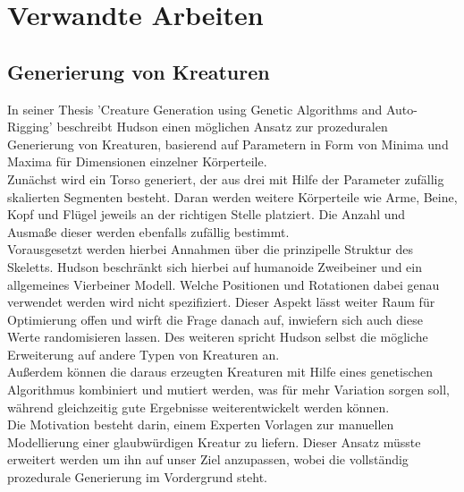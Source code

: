 \chapter{Verwandte Arbeiten}
\label{Verwandte_Arbeiten}


\section{Generierung von Kreaturen}
In seiner Thesis 'Creature Generation using Genetic Algorithms and Auto-Rigging' \cite{Hudson2013CreatureGU} beschreibt Hudson einen möglichen Ansatz zur prozeduralen Generierung von Kreaturen, basierend auf Parametern in Form von Minima und Maxima für Dimensionen einzelner Körperteile.\\ Zunächst wird ein Torso generiert, der aus drei mit Hilfe der Parameter zufällig skalierten Segmenten besteht. Daran werden weitere Körperteile wie Arme, Beine, Kopf und Flügel jeweils an der richtigen Stelle platziert. Die Anzahl und Ausmaße dieser werden ebenfalls zufällig bestimmt.\\
Vorausgesetzt werden hierbei Annahmen über die prinzipelle Struktur des Skeletts. Hudson beschränkt sich hierbei auf humanoide Zweibeiner und ein allgemeines Vierbeiner Modell. Welche Positionen und Rotationen dabei genau verwendet werden wird nicht spezifiziert. Dieser Aspekt lässt weiter Raum für Optimierung offen und wirft die Frage danach auf, inwiefern sich auch diese Werte randomisieren lassen. Des weiteren spricht Hudson selbst die mögliche Erweiterung auf andere Typen von Kreaturen an.\\
Außerdem können die daraus erzeugten Kreaturen mit Hilfe eines genetischen Algorithmus kombiniert und mutiert werden, was für mehr Variation sorgen soll, während gleichzeitig gute Ergebnisse weiterentwickelt werden können.\\
Die Motivation besteht darin, einem Experten Vorlagen zur manuellen Modellierung einer glaubwürdigen Kreatur zu liefern. Dieser Ansatz müsste erweitert werden um ihn auf unser Ziel anzupassen, wobei die vollständig prozedurale Generierung im Vordergrund steht.

